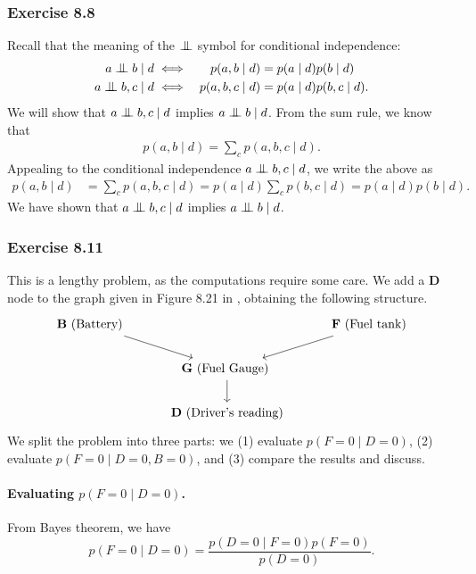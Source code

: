 \documentclass[12pt, a4paper]{article}
\newcommand{\bigCI}{\mathrel{\text{\scalebox{1.07}{$\perp\mkern-10mu\perp$}}}}
\begin{document}
\subsubsection*{Exercise 8.8}
Recall that the meaning of the $\bigCI$ symbol for conditional independence:
\begin{alignat*}{3}
	a \bigCI b \mid d &\iff & p(a, b \mid d) &=  p(a\mid d) p( b \mid d) \\
	a \bigCI b, c \mid d &\iff  & p(a, b, c \mid d) &=  p(a\mid d) p( b, c \mid d).
\end{alignat*}
We will show that $a \bigCI b, c \mid d$ implies $a \bigCI b \mid d$.
From the sum rule, we know that
\begin{align*}
	p(a, b \mid d) = \sum_c p(a, b, c \mid d).
\end{align*}
Appealing to the conditional independence $a \bigCI b, c \mid d$, we write the above as
\begin{align*}
p(a, b \mid d) &= \sum_c p(a, b, c \mid d) =  p(a\mid d) \sum_c  p( b, c \mid d) =  p(a\mid d)   p( b \mid d).
\end{align*}
We have shown that $a \bigCI b, c \mid d$ implies $a \bigCI b \mid d$.

\subsubsection*{Exercise 8.11}
This is a lengthy problem, as the computations require some care.
We add a \textbf{D} node to the graph given in Figure 8.21 in \cite{bishop_pattern_2011}, obtaining the following structure.
\[\begin{tikzcd}[column sep=3em]
\textbf{B} \text{ (Battery)} \arrow[]{dr}{}  &     & \textbf{F} \text{ (Fuel tank)} \arrow[]{dl}{} \\
  &  \textbf{G} \text{ (Fuel Gauge) }\arrow[]{d}{} & \\
  &  \textbf{D} \text{ (Driver's reading)} & 
\end{tikzcd}\]
We split the problem into three parts:
we (1) evaluate $p(F=0 \mid D = 0)$, 
(2) evaluate $p(F=0 \mid D = 0, B=0)$, and 
(3) compare the results and discuss.

\paragraph{Evaluating $p(F=0 \mid D = 0)$.}
From Bayes theorem, we have
\begin{equation*}
	p(F=0 \mid D = 0) = \frac{p(D = 0 \mid F =0) p(F=0)}{p( D = 0)}.
\end{equation*}
\end{document}

